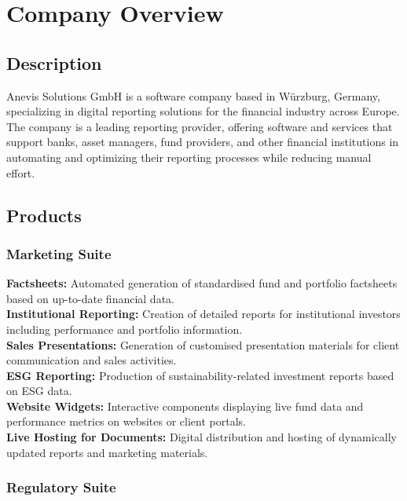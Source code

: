 \chapter{Company Overview}

\section{Description}
Anevis Solutions GmbH is a software company based in Würzburg, Germany, specializing in digital reporting solutions for the financial industry across Europe. The company is a leading reporting provider, offering software and services that support banks, asset managers, fund providers, and other financial institutions in automating and optimizing their reporting processes while reducing manual effort.
\section{Products}

\subsection{Marketing Suite}

\textbf{Factsheets:} Automated generation of standardised fund and portfolio factsheets based on up-to-date financial data.\\
\textbf{Institutional Reporting:} Creation of detailed reports for institutional investors including performance and portfolio information.\\
\textbf{Sales Presentations:} Generation of customised presentation materials for client communication and sales activities.\\
\textbf{ESG Reporting:} Production of sustainability-related investment reports based on ESG data.\\
\textbf{Website Widgets:} Interactive components displaying live fund data and performance metrics on websites or client portals.\\
\textbf{Live Hosting for Documents:} Digital distribution and hosting of dynamically updated reports and marketing materials.

\subsection{Regulatory Suite}

